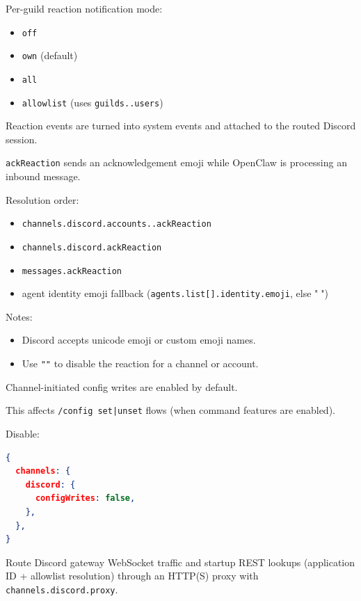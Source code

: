 Per-guild reaction notification mode:

\begin{itemize}
  \item \texttt{off}
  \item \texttt{own} (default)
  \item \texttt{all}
  \item \texttt{allowlist} (uses \texttt{guilds..users})
\end{itemize}


Reaction events are turned into system events and attached to the routed Discord session.


\texttt{ackReaction} sends an acknowledgement emoji while OpenClaw is processing an inbound message.

Resolution order:

\begin{itemize}
  \item \texttt{channels.discord.accounts..ackReaction}
  \item \texttt{channels.discord.ackReaction}
  \item \texttt{messages.ackReaction}
  \item agent identity emoji fallback (\texttt{agents.list[].identity.emoji}, else "👀")
\end{itemize}


Notes:

\begin{itemize}
  \item Discord accepts unicode emoji or custom emoji names.
  \item Use \texttt{""} to disable the reaction for a channel or account.
\end{itemize}



Channel-initiated config writes are enabled by default.

This affects \texttt{/config set|unset} flows (when command features are enabled).

Disable:

\begin{lstlisting}[language=json]
{
  channels: {
    discord: {
      configWrites: false,
    },
  },
}
\end{lstlisting}



Route Discord gateway WebSocket traffic and startup REST lookups (application ID + allowlist resolution) through an HTTP(S) proxy with \texttt{channels.discord.proxy}.

